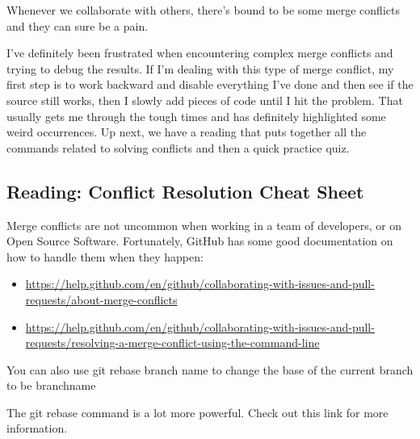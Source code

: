	Whenever we collaborate with others, there's bound to be some merge conflicts and they can sure be a pain.
	
	I've definitely been frustrated when encountering complex merge conflicts and trying to debug the results. If I'm dealing with this type of merge conflict, my first step is to work backward and disable everything I've done and then see if the source still works, then I slowly add pieces of code until I hit the problem. That usually gets me through the tough times and has definitely highlighted some weird occurrences. Up next, we have a reading that puts together all the commands related to solving conflicts and then a quick practice quiz.

	\subsection{Reading: Conflict Resolution Cheat Sheet} \label{W303f}

	Merge conflicts are not uncommon when working in a team of developers, or on Open Source Software. Fortunately, GitHub has some good documentation on how to handle them when they happen:
	
	\begin{itemize}
		\item \url{https://help.github.com/en/github/collaborating-with-issues-and-pull-requests/about-merge-conflicts}
		\item \url{https://help.github.com/en/github/collaborating-with-issues-and-pull-requests/resolving-a-merge-conflict-using-the-command-line}
	\end{itemize}
	
	You can also use git rebase branch name to change the base of the current branch to be branchname
	
	The git rebase command is a lot more powerful.  Check out this link for more information.

